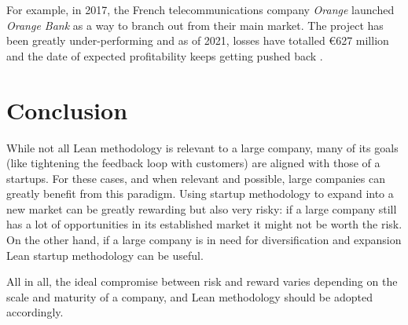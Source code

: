 \documentclass[conference]{IEEEtran}
\begin{document}
    For example, in 2017, the French telecommunications company \textit{Orange} launched \textit{Orange Bank} as a way to branch out from their main market. The project has been greatly under-performing and as of 2021, losses have totalled €627 million and the date of expected profitability keeps getting pushed back \cite{orange}.

    \section{Conclusion}
    \label{section:conclusion}

    While not all Lean methodology is relevant to a large company, many of its goals (like tightening the
    feedback loop with customers) are aligned with those of a startups. For these cases, and when relevant
    and possible, large companies can greatly benefit from this paradigm.
    Using startup methodology to expand into a new market can be greatly rewarding but also very risky: if a large company still has a lot of opportunities in its established market it might not be worth the risk.
    On the other hand, if a large company is in need for diversification and expansion Lean startup methodology can be useful.

    All in all, the ideal compromise between risk and reward varies depending
    on the scale and maturity of a company, and Lean methodology should be adopted accordingly.


    
    
\end{document}
